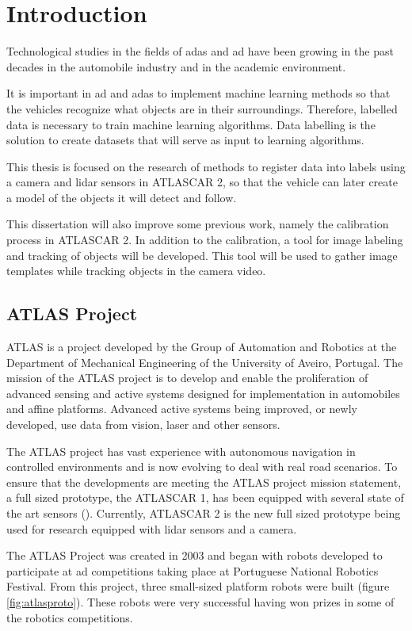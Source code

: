 \chapter{Introduction}
Technological studies in the fields of \gls{adas} and \gls{ad} have been growing in the past decades in the automobile industry and in the academic environment. 

It is important in \gls{ad} and \gls{adas} to implement machine learning methods so that the vehicles recognize what objects are in their surroundings. Therefore, labelled data is necessary to train machine learning algorithms. Data labelling is the solution to create datasets that will serve as input to learning algorithms.

This thesis is focused on the research of methods to register data into labels using a camera and \gls{lidar} sensors in ATLASCAR 2, so that the vehicle can later create a model of the objects it will detect and follow.

This dissertation will also improve some previous work, namely the calibration process in ATLASCAR 2. In addition to the calibration, a tool for image labeling and tracking of objects will be developed. This tool will be used to gather image templates while tracking objects in the camera video. 

\section{ATLAS Project}

ATLAS is a project developed by the Group of Automation and Robotics at the Department of Mechanical Engineering of the University of Aveiro, Portugal. The mission of the ATLAS project is to develop and enable the proliferation of advanced sensing and active systems designed for implementation in automobiles and affine platforms. Advanced active systems being improved, or newly developed, use data from vision, laser and other sensors. 

The ATLAS project has vast experience with autonomous navigation in controlled environments and is now evolving to deal with real road scenarios. To ensure that the developments are meeting the ATLAS project mission statement, a full sized prototype, the ATLASCAR 1, has been equipped with several state of the art sensors (\cite{LARlabs}). Currently, ATLASCAR 2 is the new full sized prototype being used for research equipped with \gls{lidar} sensors and a camera.

The ATLAS Project was created in 2003 and began with robots developed to participate at \gls{ad} competitions taking place at Portuguese National Robotics Festival. From this project, three small-sized platform robots were built (figure \ref{fig:atlasproto}). These robots were very successful having won prizes in some of the robotics competitions. 


